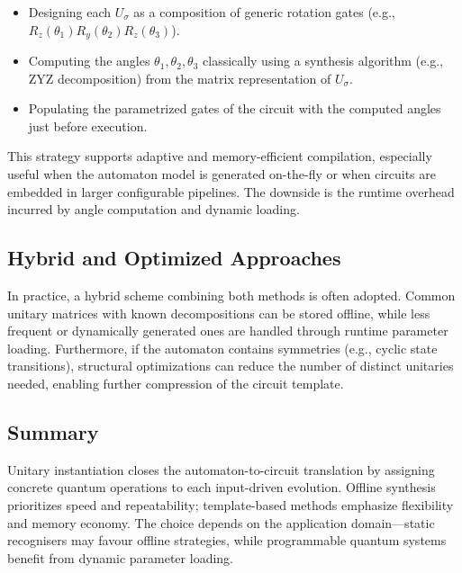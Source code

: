 \begin{itemize}
    \item Designing each $U_{\sigma}$ as a composition of generic rotation gates (e.g., $R_z(\theta_1) R_y(\theta_2) R_z(\theta_3)$).
    \item Computing the angles $\theta_1, \theta_2, \theta_3$ classically using a synthesis algorithm (e.g., ZYZ decomposition) from the matrix representation of $U_{\sigma}$.
    \item Populating the parametrized gates of the circuit with the computed angles just before execution.
\end{itemize}

This strategy supports adaptive and memory-efficient compilation, especially useful when the automaton model is generated on-the-fly or when circuits are embedded in larger configurable pipelines. The downside is the runtime overhead incurred by angle computation and dynamic loading.

\subsection{Hybrid and Optimized Approaches}

In practice, a hybrid scheme combining both methods is often adopted. Common unitary matrices with known decompositions can be stored offline, while less frequent or dynamically generated ones are handled through runtime parameter loading. Furthermore, if the automaton contains symmetries (e.g., cyclic state transitions), structural optimizations can reduce the number of distinct unitaries needed, enabling further compression of the circuit template.

\subsection{Summary}

Unitary instantiation closes the automaton-to-circuit translation by assigning concrete quantum operations to each input-driven evolution. Offline synthesis prioritizes speed and repeatability; template-based methods emphasize flexibility and memory economy. The choice depends on the application domain—static recognisers may favour offline strategies, while programmable quantum systems benefit from dynamic parameter loading.
